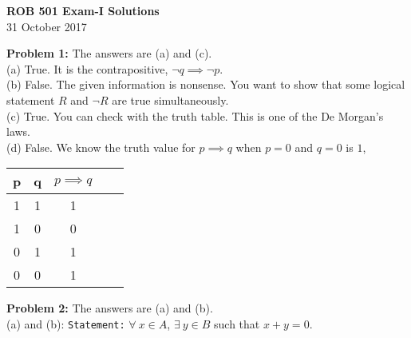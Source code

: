 \documentclass[letterpaper]{article}
\begin{document}
\newcommand{\trace}{\mathrm{trace}}
\newcommand{\real}{\mathbb R}  %
\newcommand{\nat}{\mathbb R}   %
\newcommand{\cp}{\mathbb C}    %
\newcommand{\ds}{\displaystyle}
\newcommand{\mf}[2]{\frac{\ds #1}{\ds #2}}
\newcommand{\book}[2]{{Luenberger, Page~#1, }{Prob.~#2}}
\newcommand{\spanof}[1]{\textrm{span} \{ #1 \}}
\parindent 0pt


\begin{center}
{\large \bf ROB 501 Exam-I Solutions}\\
31 October 2017
\end{center}

\vspace*{0.5cm}





\bigskip

\noindent \textbf{Problem 1:} The answers are (a) and (c). \\

(a) True. It is the contrapositive, $\neg q \implies \neg p$. \\

(b) False. The given information is nonsense. You want to show that some logical statement $R$ and $\neg R$ are true simultaneously.  \\

(c) True. You can check with the truth table. This is one of the De Morgan's laws. \\

(d) False. We know the truth value for $p \implies q$ when $p=0$ and $q=0$ is $1$,

\begin{center}
\begin{tabular}{|c|c|c|c|c|}
\hline
p &q & $p \implies q$ \\  \hline
1 & 1 & 1  \\
1 & 0 & 0  \\
0 & 1 & 1  \\
0 & 0 & 1  \\ \hline
\end{tabular}
\end{center}


\bigskip

\noindent \textbf{Problem 2:} The answers are (a) and (b). \\

(a) and (b): \texttt{Statement:}   $\forall~x \in A$, $\exists~y \in B$   such that $x+y=0$. \\
\end{document}
